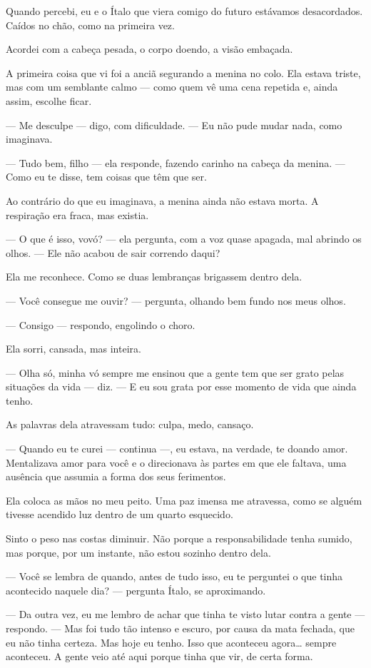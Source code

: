 Quando percebi, eu e o Ítalo que viera comigo do futuro estávamos desacordados.
Caídos no chão, como na primeira vez.

Acordei com a cabeça pesada, o corpo doendo, a visão embaçada.

A primeira coisa que vi foi a anciã segurando a menina no colo.  
Ela estava triste, mas com um semblante calmo — como quem vê uma cena repetida e, ainda assim, escolhe ficar.

— Me desculpe — digo, com dificuldade. — Eu não pude mudar nada, como imaginava.

— Tudo bem, filho — ela responde, fazendo carinho na cabeça da menina. — Como eu te disse, tem coisas que têm que ser.

Ao contrário do que eu imaginava, a menina ainda não estava morta.  
A respiração era fraca, mas existia.

— O que é isso, vovó? — ela pergunta, com a voz quase apagada, mal abrindo os olhos. — Ele não acabou de sair correndo daqui?

Ela me reconhece.  
Como se duas lembranças brigassem dentro dela.

— Você consegue me ouvir? — pergunta, olhando bem fundo nos meus olhos.

— Consigo — respondo, engolindo o choro.

Ela sorri, cansada, mas inteira.

— Olha só, minha vó sempre me ensinou que a gente tem que ser grato pelas situações da vida — diz. — E eu sou grata por esse momento de vida que ainda tenho.

As palavras dela atravessam tudo: culpa, medo, cansaço.

— Quando eu te curei — continua —, eu estava, na verdade, te doando amor.
Mentalizava amor para você e o direcionava às partes em que ele faltava, uma ausência que assumia a forma dos seus ferimentos.

Ela coloca as mãos no meu peito.  
Uma paz imensa me atravessa, como se alguém tivesse acendido luz dentro de um quarto esquecido.

Sinto o peso nas costas diminuir.  
Não porque a responsabilidade tenha sumido, mas porque, por um instante, não estou sozinho dentro dela.

— Você se lembra de quando, antes de tudo isso, eu te perguntei o que tinha acontecido naquele dia? — pergunta Ítalo, se aproximando.

— Da outra vez, eu me lembro de achar que tinha te visto lutar contra a gente — respondo. — Mas foi tudo tão intenso e escuro, por causa da mata fechada, que eu não tinha certeza.  
Mas hoje eu tenho.  
Isso que aconteceu agora… sempre aconteceu.  
A gente veio até aqui porque tinha que vir, de certa forma.

